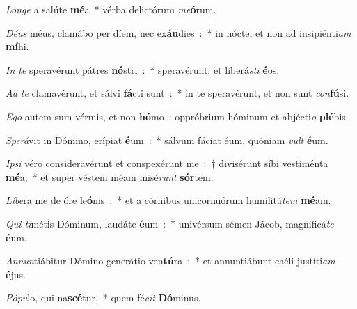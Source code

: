\documentclass[letterpaper,12pt]{article} %
\begin{document}
\begin{psalmverses}[1]
\item \emph{Longe} a salúte \textbf{mé}a~* vérba delictórum \emph{me}\textbf{ó}rum.
\item \emph{Déus} méus, clamábo per díem, nec ex\textbf{áu}dies~:~* in nócte, et non ad insipiénti\emph{am} \textbf{mí}hi.
\end{psalmverses}
\vspace{-0.7\baselineskip}
\begin{psalmverses}[4]
\item \emph{In te} speravérunt pátres \textbf{nó}stri~:~* speravérunt, et liberá\emph{sti} \textbf{é}os.
\item \emph{Ad te} clamavérunt, et sálvi \textbf{fá}cti sunt~:~* in te speravérunt, et non sunt \emph{con}\textbf{fú}si.
\item \emph{Ego} autem sum vérmis, et non \textbf{hó}mo~: oppróbrium hóminum et abjécti\emph{o} \textbf{plé}bis.
\end{psalmverses}
\vspace{-1.6\baselineskip}
\begin{psalmverses}[8]
\item \emph{Sperá}vit in Dómino, erípiat \textbf{é}um~:~* sálvum fáciat éum, quóniam \emph{vult} \textbf{é}um.
\item \emph{Ipsi} véro consideravérunt et conspexérunt me~:~† divisérunt síbi vestiménta \textbf{mé}a,~* et super véstem méam misé\emph{runt} \textbf{sór}tem.
\item \emph{Líbe}ra me de óre le\textbf{ó}nis~:~* et a córnibus unicornuórum humilitá\emph{tem} \textbf{mé}am.
\item \emph{Qui ti}métis Dóminum, laudáte \textbf{é}um~:~* univérsum sémen Jácob, magnificá\emph{te} \textbf{é}um.
\item \emph{Annun}tiábitur Dómino generátio ven\textbf{tú}ra~:~* et annuntiábunt caéli justíti\emph{am} \textbf{é}jus.
\item \emph{Pópu}lo, qui na\textbf{scé}tur,~* quem fé\emph{cit} \textbf{Dó}minus.
\end{psalmverses}
\end{document}
